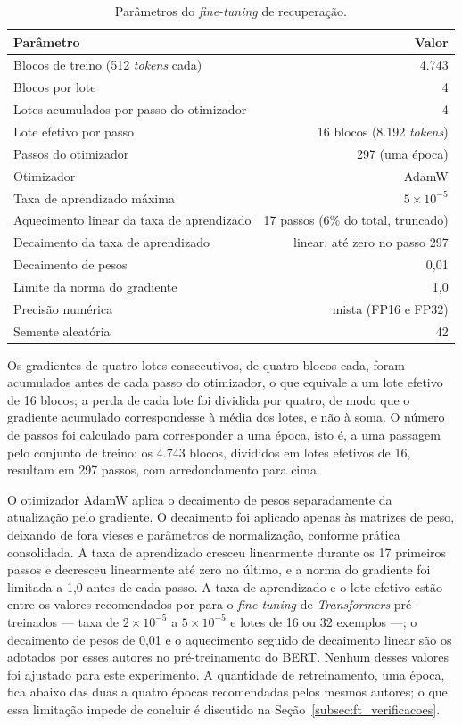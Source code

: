 \begin{table}[htb]
\centering
\caption{Parâmetros do \textit{fine-tuning} de recuperação.}
\label{tab:finetune_protocolo}
\small
\begin{tabular}{p{7.5cm} r}
\hline
\textbf{Parâmetro} & \textbf{Valor} \\
\hline
Blocos de treino (512 \textit{tokens} cada) & 4.743 \\
Blocos por lote & 4 \\
Lotes acumulados por passo do otimizador & 4 \\
Lote efetivo por passo & 16 blocos (8.192 \textit{tokens}) \\
Passos do otimizador & 297 (uma época) \\
Otimizador & AdamW \\
Taxa de aprendizado máxima & $5 \times 10^{-5}$ \\
Aquecimento linear da taxa de aprendizado & 17 passos (6\% do total, truncado) \\
Decaimento da taxa de aprendizado & linear, até zero no passo 297 \\
Decaimento de pesos & 0,01 \\
Limite da norma do gradiente & 1,0 \\
Precisão numérica & mista (FP16 e FP32) \\
Semente aleatória & 42 \\
\hline
\end{tabular}
\end{table}

Os gradientes de quatro lotes consecutivos, de quatro blocos cada, foram acumulados antes
de cada passo do otimizador, o que equivale a um lote efetivo de 16 blocos; a perda de
cada lote foi dividida por quatro, de modo que o gradiente acumulado correspondesse à
média dos lotes, e não à soma. O número de passos foi calculado para corresponder a uma
época, isto é, a uma passagem pelo conjunto de treino: os 4.743 blocos, divididos em lotes efetivos de 16,
resultam em 297 passos, com arredondamento para cima.

O otimizador AdamW \cite{Loshchilov2019} aplica o decaimento de pesos separadamente da
atualização pelo gradiente. O decaimento foi aplicado apenas às matrizes de peso,
deixando de fora vieses e parâmetros de normalização, conforme prática consolidada. A
taxa de aprendizado cresceu linearmente durante os 17 primeiros passos e decresceu
linearmente até zero no último, e a norma do gradiente foi limitada a 1,0 antes de cada
passo. A taxa de aprendizado e o lote efetivo estão entre os valores recomendados por
 para o \textit{fine-tuning} de \textit{Transformers}
pré-treinados --- taxa de $2 \times 10^{-5}$ a $5 \times 10^{-5}$ e lotes de 16 ou 32
exemplos ---; o decaimento de pesos de 0,01 e o aquecimento seguido de decaimento linear
são os adotados por esses autores no pré-treinamento do BERT. Nenhum desses valores foi
ajustado para este experimento. A quantidade de
retreinamento, uma época, fica abaixo das duas a quatro épocas recomendadas pelos mesmos
autores; o que essa limitação impede de concluir é discutido na
Seção~\ref{subsec:ft_verificacoes}.

